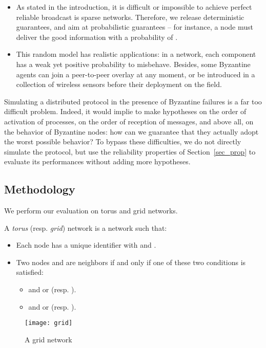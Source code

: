 \documentclass[a4paper,11pt]{article}
\begin{document}
\begin{itemize}
\item As stated in the introduction, it is difficult or impossible to achieve perfect reliable broadcast is sparse networks. Therefore, we release deterministic guarantees, and aim at probabilistic guarantees -- for instance, a node must deliver the good information with a probability of .
\item This random model has realistic applications:
in a network, each component has a weak yet positive probability to misbehave. Besides, some Byzantine agents can join a peer-to-peer overlay at any moment, or be introduced in a collection of wireless sensors before their deployment on the field.
\end{itemize}

Simulating a distributed protocol in the presence of Byzantine failures is a far too difficult problem. Indeed, it would implie to make hypotheses on the order of activation of processes, on the order of reception of messages, and above all, on the behavior of Byzantine nodes: how can we guarantee that they actually adopt the worst possible behavior? To bypass these difficulties, we do not directly simulate the protocol, but use the reliability properties of Section~\ref{sec_prop} to evaluate its performances without adding more hypotheses.

\subsection{Methodology}

We perform our evaluation on torus and grid networks.

\begin{definition}
A  \emph{torus} (resp. \emph{grid}) network is a network such that:
\begin{itemize}
\item Each node has a unique identifier  with
 and .
\item Two nodes  and  are neighbors if and only if one of these two conditions is satisfied:
\begin{itemize}
\item  and  or  (resp. ).
\item  and  or  (resp. ).
\end{itemize}
\end{itemize}
\end{definition}


\begin{figure}
\begin{center}
\texttt{[image: grid]}
\caption{A  grid network} 
\label{fig:grid}
\end{center}
\end{figure}
\end{document}
